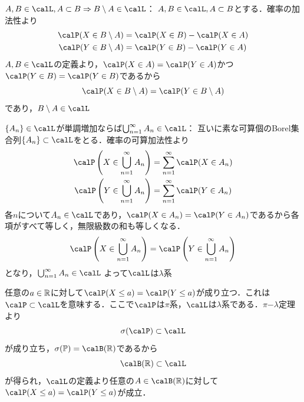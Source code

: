 \documentclass[dvipdfmx]{jsreport}
\begin{document}
\begin{souanswer}
\begin{enumerate_alpha}
	\item $A, B\in \calL, A\subset B\Rightarrow B\setminus A\in \calL$：
	$A, B\in \calL, A\subset B$とする．確率の加法性より
\begin{align}
	\calP(X\in B\setminus A)&= \calP(X\in B)- \calP(X\in A)\\
	\calP(Y\in B\setminus A)&= \calP(Y\in B)- \calP(Y\in A)
\end{align}
	$A, B\in \calL$の定義より，$\calP(X\in A)= \calP(Y\in A)$かつ$\calP(Y\in B)= \calP(Y\in B)$であるから
\begin{equation}
	\calP(X\in B\setminus A)= \calP(Y\in B\setminus A)
\end{equation}
	であり，$B\setminus A\in \calL$
	\item $\{A_n\}\in \calL$が単調増加ならば$\bigcup_{n= 1}^\infty A_n\in \calL$：
	互いに素な可算個のBorel集合列$\{A_n\}\subset \calL$をとる．確率の可算加法性より
\begin{align}
	\calP\left(X\in \bigcup_{n= 1}^\infty A_n\right)&= \sum_{n= 1}^\infty \calP(X\in A_n)\\
	\calP\left(Y\in \bigcup_{n= 1}^\infty A_n\right)&= \sum_{n= 1}^\infty \calP(Y\in A_n)
\end{align}
	各$n$について$A_n\in \calL$であり，$\calP(X\in A_n)= \calP(Y\in A_n)$であるから各項がすべて等しく，無限級数の和も等しくなる．
\begin{equation}
	\calP\left(X\in \bigcup_{n= 1}^\infty A_n\right)= \calP\left(Y\in \bigcup_{n= 1}^\infty A_n\right)
\end{equation}
	となり，$\bigcup_{n= 1}^\infty A_n\in \calL$
	よって$\calL$は$\lambda$系
\end{enumerate_alpha}
	任意の$a\in \mathbb{R}$に対して$\calP(X\le a)= \calP(Y\le a)$が成り立つ．これは$\calP\subset \calL$を意味する．ここで$\calP$は$\pi$系，$\calL$は$\lambda$系である．$\pi\mathrm{-}\lambda$定理より
\begin{equation}
	\sigma(\calP)\subset \calL
\end{equation}
	が成り立ち，$\sigma(\P)= \calB(\R)$であるから
\begin{equation}
	\calB(\R)\subset \calL
\end{equation}
	が得られ，$\calL$の定義より任意の$A\in \calB(\R)$に対して$\calP(X\le a)= \calP(Y\le a)$が成立．
\end{souanswer}
\end{document}
